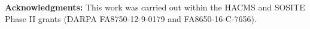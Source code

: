 \documentclass[10pt, conference]{IEEEtran}
\begin{document}


%


%









%

%






\textbf{Acknowledgments:} This work was carried out within the HACMS and SOSITE Phase II grants (DARPA FA8750-12-9-0179 and FA8650-16-C-7656).


%


~
\end{document}

